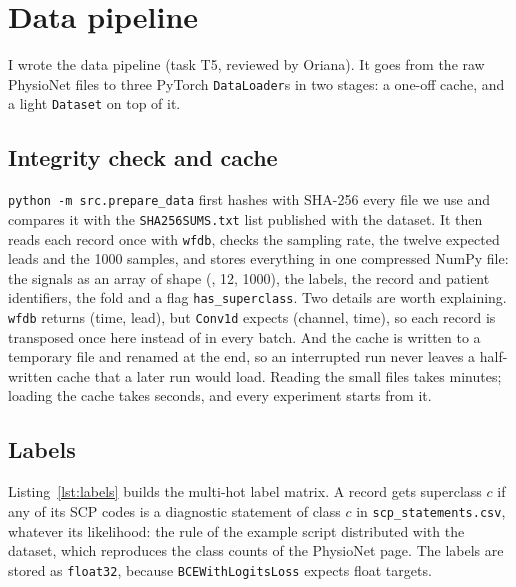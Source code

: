 \section{Data pipeline}\label{sec:mllb-data}

I wrote the data pipeline (task T5, reviewed by Oriana). It goes from the raw PhysioNet files to three
PyTorch \texttt{DataLoader}s in two stages: a one-off cache, and a light \texttt{Dataset} on top of it.

\subsection{Integrity check and cache}

\texttt{python -m src.prepare\_data} first hashes with SHA-256 every file we use and compares it with the
\texttt{SHA256SUMS.txt} list published with the dataset. It then reads each record once with \texttt{wfdb},
checks the sampling rate, the twelve expected leads and the 1000 samples, and stores everything in one
compressed NumPy file: the signals as an array of shape (\edaNRecordsAll{}, 12, 1000), the labels, the
record and patient identifiers, the fold and a flag \texttt{has\_superclass}. Two details are worth
explaining. \texttt{wfdb} returns (time, lead), but \texttt{Conv1d} expects (channel, time), so each record is
transposed once here instead of in every batch. And the cache is written to a temporary file and renamed at
the end, so an interrupted run never leaves a half-written cache that a later run would load. Reading the
\edaNRecordsAll{} small files takes minutes; loading the cache takes seconds, and every experiment starts from
it.

\subsection{Labels}

Listing~\ref{lst:labels} builds the multi-hot label matrix. A record gets superclass $c$ if any of its SCP
codes is a diagnostic statement of class $c$ in \texttt{scp\_statements.csv}, whatever its likelihood: the
rule of the example script distributed with the dataset, which reproduces the class counts of the PhysioNet
page. The labels are stored as \texttt{float32}, because \texttt{BCEWithLogitsLoss} expects float targets.

